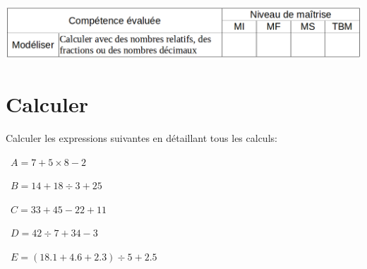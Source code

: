 	\includegraphics[scale=0.4]{competences}

\section{Calculer}
Calculer les expressions suivantes en détaillant tous les calculs:
\begin{questions}
	
	
	\question[2]  $A = 7 + 5 \times 8 - 2$
	
	\fillwithdottedlines{6cm}
	
	\question[2]  $B = 14 + 18 \div 3 + 25$
	
	\fillwithdottedlines{6cm}
	
	\newpage
	
	\question[2]  $C = 33 + 45 - 22 + 11$
	
	\fillwithdottedlines{6cm}
	
	
	
	\question[2]  $D = 42 \div 7 + 34 - 3$
	
	\fillwithdottedlines{6cm}
	
	\question[2]  $E = (\num{18.1} + \num{4.6} + \num{2.3}) \div 5 + \num{2.5}$
	
	\fillwithdottedlines{6cm}
	
\end{questions}


